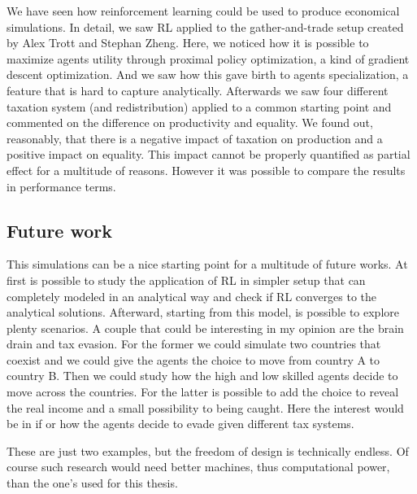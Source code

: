 
We have seen how reinforcement learning could be used to produce economical simulations. In detail, we saw RL applied to the gather-and-trade setup created by Alex Trott and Stephan Zheng. Here, we noticed how it is possible to maximize agents utility through proximal policy optimization, a kind of gradient descent optimization. And we saw how this gave birth to agents specialization, a feature that is hard to capture analytically. Afterwards we saw four different taxation system (and redistribution) applied to a common starting point and commented on the difference on productivity and equality. We found out, reasonably, that there is a negative impact of taxation on production and a positive impact on equality. This impact cannot be properly quantified as partial effect for a multitude of reasons. However it was possible to compare the results in performance terms. 




\subsection*{Future work}

This simulations can be a nice starting point for a multitude of future works. At first is possible to study the application of RL in simpler setup that can completely modeled in an analytical way and check if RL converges to the analytical solutions. Afterward, starting from this model, is possible to explore plenty scenarios. A couple that could be interesting in my opinion are the brain drain and tax evasion. For the former we could simulate two countries that coexist and we could give the agents the choice to move from country A to country B. Then we could study how the high and low skilled agents decide to move across the countries. For the latter is possible to add the choice to reveal the real income and a small possibility to being caught. Here the interest would be in if or how the agents decide to evade given different tax systems. 

These are just two examples, but the freedom of design is technically endless. Of course such research would need better machines, thus computational power, than the one's used for this thesis.